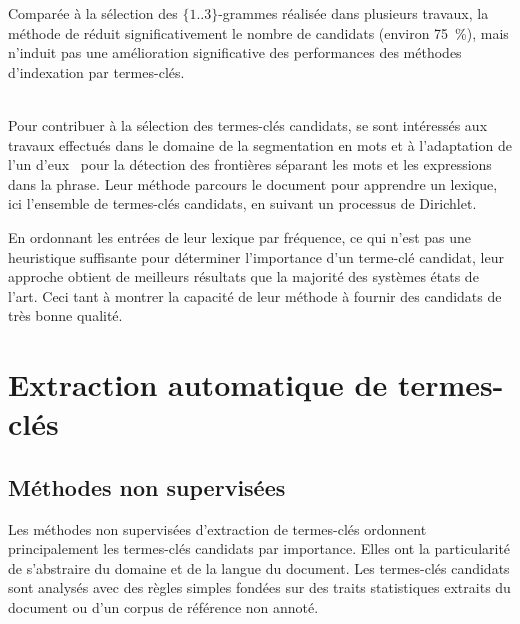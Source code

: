 
    Comparée à la sélection des $\{1..3\}$-grammes réalisée dans plusieurs
    travaux, la méthode de  réduit
    significativement le nombre de candidats (environ 75~\%), mais n'induit pas
    une amélioration significative des performances des méthodes d'indexation
    par termes-clés.

    ~\\Pour contribuer à la sélection des termes-clés candidats,
     se sont intéressés aux travaux
    effectués dans le domaine de la segmentation en mots et à l'adaptation de
    l'un d'eux~\cite{goldwater2009bayesianwordsegmentation} pour la détection
    des frontières séparant les mots et les expressions dans la phrase. Leur
    méthode parcours le document pour apprendre un lexique, ici l'ensemble de
    termes-clés candidats, en suivant un processus de Dirichlet.

    En ordonnant les entrées de leur lexique par fréquence, ce qui n'est pas une
    heuristique suffisante pour déterminer l'importance d'un terme-clé candidat,
    leur approche obtient de meilleurs résultats que la majorité des systèmes
    états de l'art. Ceci tant à montrer la capacité de leur méthode à fournir
    des candidats de très bonne qualité.


  \section{Extraction automatique de termes-clés}
  \label{sec:main-state_of_the_art-automatic_keyphrase_extraction}

    \subsection{Méthodes non supervisées}
    \label{subsec:main-state_of_the_art-automatic_keyphrase_extraction-unsupervised_keyphrase_extraction}
      Les méthodes non supervisées d'extraction de termes-clés ordonnent
      principalement les termes-clés candidats par importance. Elles ont la
      particularité de s'abstraire du domaine et de la langue du document. Les
      termes-clés candidats sont analysés avec des règles simples fondées sur
      des traits statistiques extraits du document ou d'un corpus de référence
      non annoté.

